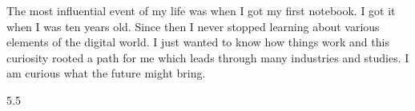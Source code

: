 \documentclass[9pt]{developercv} %
\begin{document}
\vspace{0.5cm}



\begin{minipage}[t]{0.4\textwidth} %
	\vspace{-\baselineskip} %
	The most influential event of my life was when I got my first notebook. I got it when I was ten years old. Since then I never stopped learning about various elements of the digital world. I just wanted to know how things work and this curiosity rooted a path for me which leads through many industries and studies. I am curious what the future might bring.
\end{minipage}
\hfill %
\begin{minipage}[t]{0.5\textwidth} %
	\vspace{-\baselineskip} %
	\begin{barchart}{5.5}
	\end{barchart}
\end{minipage}

\begin{center}
\end{center}


\end{document}
